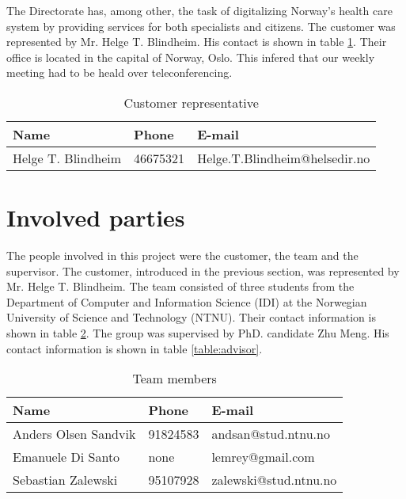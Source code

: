 The Directorate has, among other, the task of digitalizing Norway's health care system by providing services for both specialists and citizens.
The customer was represented by Mr. Helge T. Blindheim. His contact is shown in table \ref{table:client}. Their office is located in the capital of Norway, Oslo. This infered that our weekly meeting had to be heald over teleconferencing. 

\begin{table}[h]
\begin{center}
\begin{tabular}{ l | l | l }
  \hline
  Name & Phone & E-mail \\
  \hline\noalign{\smallskip}\noalign{\smallskip}\hline
  Helge T. Blindheim	& 46675321 & Helge.T.Blindheim@helsedir.no \\
  \hline
\end{tabular}
\end{center}
\caption{Customer representative}
\label{table:client}
\end{table}


\section{Involved parties}

The people involved in this project were the customer, the team and the supervisor.
The customer, introduced in the previous section, was represented by Mr. Helge T. Blindheim.
The team consisted of three students from the Department of Computer and Information Science (IDI) at the Norwegian University of Science and Technology (NTNU). Their contact information is shown in table \ref{table:team}. The group was supervised by PhD. candidate Zhu Meng. His contact information is shown in table \ref{table:advisor}.

\begin{table}[h]
\begin{center}
\begin{tabular}{ l | l | l }
  \hline
  Name & Phone & E-mail \\
  \hline\noalign{\smallskip}\noalign{\smallskip}\hline
  Anders Olsen Sandvik	& 91824583   & andsan@stud.ntnu.no \\
  Emanuele Di Santo     & none       & lemrey@gmail.com \\
  Sebastian Zalewski    & 95107928   & zalewski@stud.ntnu.no \\
  \hline
\end{tabular}
\end{center}
\caption{Team members}
\label{table:team}
\end{table}

